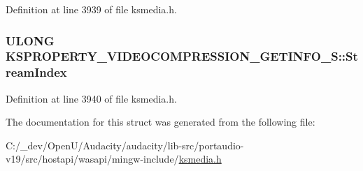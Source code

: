 Definition at line 3939 of file ksmedia.\+h.

\subsubsection[{\texorpdfstring{Stream\+Index}{StreamIndex}}]{\setlength{\rightskip}{0pt plus 5cm}U\+L\+O\+NG K\+S\+P\+R\+O\+P\+E\+R\+T\+Y\+\_\+\+V\+I\+D\+E\+O\+C\+O\+M\+P\+R\+E\+S\+S\+I\+O\+N\+\_\+\+G\+E\+T\+I\+N\+F\+O\+\_\+\+S\+::\+Stream\+Index}\hypertarget{struct_k_s_p_r_o_p_e_r_t_y___v_i_d_e_o_c_o_m_p_r_e_s_s_i_o_n___g_e_t_i_n_f_o___s_a0afa1e91ddeb085a4c8a7f6d411546e0}{}\label{struct_k_s_p_r_o_p_e_r_t_y___v_i_d_e_o_c_o_m_p_r_e_s_s_i_o_n___g_e_t_i_n_f_o___s_a0afa1e91ddeb085a4c8a7f6d411546e0}


Definition at line 3940 of file ksmedia.\+h.



The documentation for this struct was generated from the following file\+:\begin{DoxyCompactItemize}
\item 
C\+:/\+\_\+dev/\+Open\+U/\+Audacity/audacity/lib-\/src/portaudio-\/v19/src/hostapi/wasapi/mingw-\/include/\hyperlink{ksmedia_8h}{ksmedia.\+h}\end{DoxyCompactItemize}
